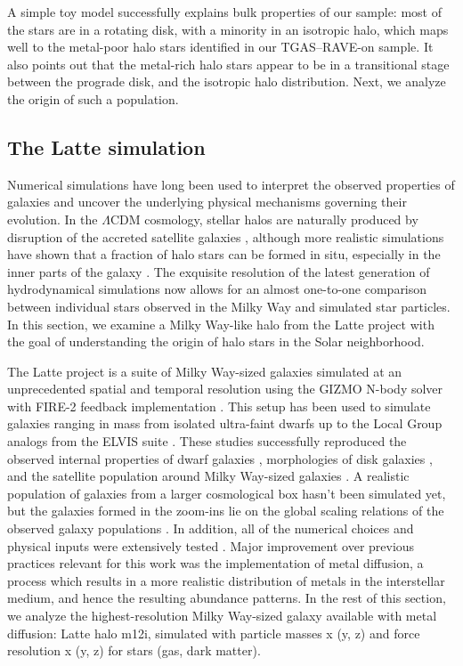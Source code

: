 \documentclass[apj, twocolappendix, numberedappendix, appendixfloats]{emulateapj}
\begin{document}
A simple toy model successfully explains bulk properties of our sample: most of the stars are in a rotating disk, with a minority in an isotropic halo, which maps well to the metal-poor halo stars identified in our TGAS--RAVE-on sample.
It also points out that the metal-rich halo stars appear to be in a transitional stage between the prograde disk, and the isotropic halo distribution.
Next, we analyze the origin of such a population.

\subsection{The Latte simulation}
\label{sec:latte}
Numerical simulations have long been used to interpret the observed properties of galaxies and uncover the underlying physical mechanisms governing their evolution.
In the $\Lambda$CDM cosmology, stellar halos are naturally produced by disruption of the accreted satellite galaxies \citep[e.g.,][]{bj2005, johnston2008}, although more realistic simulations have shown that a fraction of halo stars can be formed in situ, especially in the inner parts of the galaxy \citep[e.g.,][]{zolotov2009}.
The exquisite resolution of the latest generation of hydrodynamical simulations now allows for an almost one-to-one comparison between individual stars observed in the Milky Way and simulated star particles.
In this section, we examine a Milky Way-like halo from the Latte project \citep{wetzel2016} with the goal of understanding the origin of halo stars in the Solar neighborhood.

The Latte project is a suite of Milky Way-sized galaxies simulated at an unprecedented spatial and temporal resolution using the GIZMO N-body solver \citep{hopkins2015} with FIRE-2 feedback implementation \citep[Feedback In Realistic Environments,][]{hopkins2017}.
This setup has been used to simulate galaxies ranging in mass from isolated ultra-faint dwarfs \citep{wheeler2015} up to the Local Group analogs from the ELVIS suite \citep{gk2014}.
These studies successfully reproduced the observed internal properties of dwarf galaxies \citep{elbadry2016}, morphologies of disk galaxies \citep{ma2016}, and the satellite population around Milky Way-sized galaxies \citep{wetzel2016}.
A realistic population of galaxies from a larger cosmological box hasn't been simulated yet, but the galaxies formed in the zoom-ins lie on the global scaling relations of the observed galaxy populations \citep{hopkins2014, feldmann2016}.
In addition, all of the numerical choices and physical inputs were extensively tested \citep{hopkins2017}.
Major improvement over previous practices relevant for this work was the implementation of metal diffusion, a process which results in a more realistic distribution of metals in the interstellar medium, and hence the resulting abundance patterns.
In the rest of this section, we analyze the highest-resolution Milky Way-sized galaxy available with metal diffusion: Latte halo m12i, simulated with particle masses x (y, z) and force resolution x (y, z) for stars (gas, dark matter).
\end{document}
